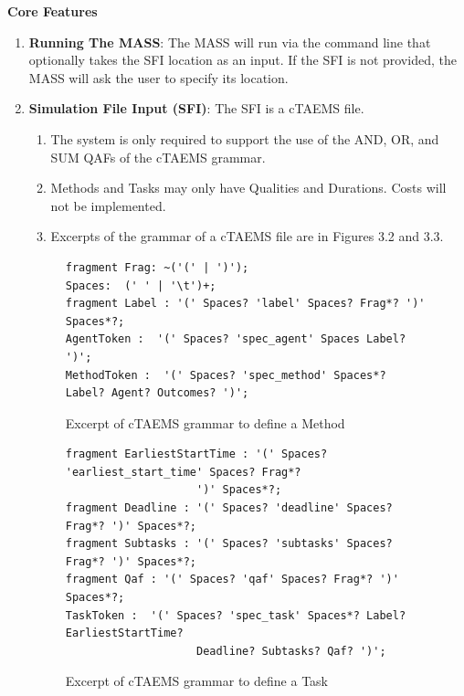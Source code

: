 \begin{center} \textbf{Core Features} \end{center}

\begin{enumerate}

  \item\textbf{Running The MASS}: The MASS will run via the command line that optionally takes the SFI location as an input. If the SFI is not provided, the MASS will ask the user to specify its location. 
  
  \item\textbf{Simulation File Input (SFI)}: The SFI is a cTAEMS file.
    \begin{enumerate}
    \item The system is only required to support the use of the AND, OR, and SUM QAFs of the cTAEMS grammar.
    \item Methods and Tasks may only have Qualities and Durations. Costs will not be implemented.
    \item Excerpts of the grammar of a cTAEMS file are in Figures 3.2 and 3.3.
  \end{enumerate}

\begin{figure}
\begin{verbatim}
fragment Frag: ~('(' | ')');
Spaces:  (' ' | '\t')+;
fragment Label : '(' Spaces? 'label' Spaces? Frag*? ')' Spaces*?;
AgentToken :  '(' Spaces? 'spec_agent' Spaces Label? ')';
MethodToken :  '(' Spaces? 'spec_method' Spaces*? Label? Agent? Outcomes? ')';
\end{verbatim}
\caption{Excerpt of cTAEMS grammar to define a Method}
\label{fig:Grammar1}
\end{figure}

\begin{figure}[H]
\begin{verbatim}
fragment EarliestStartTime : '(' Spaces? 'earliest_start_time' Spaces? Frag*?
                    ')' Spaces*?;
fragment Deadline : '(' Spaces? 'deadline' Spaces? Frag*? ')' Spaces*?;
fragment Subtasks : '(' Spaces? 'subtasks' Spaces? Frag*? ')' Spaces*?;
fragment Qaf : '(' Spaces? 'qaf' Spaces? Frag*? ')' Spaces*?;
TaskToken :  '(' Spaces? 'spec_task' Spaces*? Label? EarliestStartTime?
                    Deadline? Subtasks? Qaf? ')';
\end{verbatim}
\caption{Excerpt of cTAEMS grammar to define a Task}
\label{fig:Grammar2}
\end{figure}
  

\end{enumerate}

